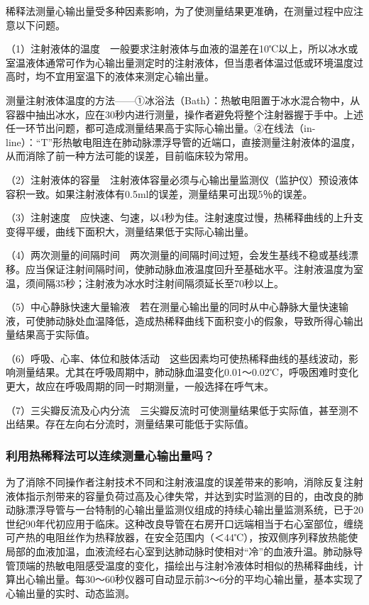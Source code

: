 稀释法测量心输出量受多种因素影响，为了使测量结果更准确，在测量过程中应注意以下问题。

（1）注射液体的温度　一般要求注射液体与血液的温差在10℃以上，所以冰水或室温液体通常可作为心输出量测定时的注射液体，但当患者体温过低或环境温度过高时，均不宜用室温下的液体来测定心输出量。

测量注射液体温度的方法------①冰浴法（Bath）：热敏电阻置于冰水混合物中，从容器中抽出冰水，应在30秒内进行测量，操作者避免将整个注射器握于手中。上述任一环节出问题，都可造成测量结果高于实际心输出量。②在线法（in-line）：“T”形热敏电阻连在肺动脉漂浮导管的近端口，直接测量注射液体的温度，从而消除了前一种方法可能的误差，目前临床较为常用。

（2）注射液体的容量　注射液体容量必须与心输出量监测仪（监护仪）预设液体容积一致。如果注射液体有0.5ml的误差，测量结果可出现5％的误差。

（3）注射速度　应快速、匀速，以4秒为佳。注射速度过慢，热稀释曲线的上升支变得平缓，曲线下面积大，测量结果低于实际心输出量。

（4）两次测量的间隔时间　两次测量的间隔时间过短，会发生基线不稳或基线漂移。应当保证注射间隔时间，使肺动脉血液温度回升至基础水平。注射液温度为室温，须间隔35秒；注射液为冰水时注射间隔须延长至70秒以上。

（5）中心静脉快速大量输液　若在测量心输出量的同时从中心静脉大量快速输液，可使肺动脉处血温降低，造成热稀释曲线下面积变小的假象，导致所得心输出量结果高于实际值。

（6）呼吸、心率、体位和肢体活动　这些因素均可使热稀释曲线的基线波动，影响测量结果。尤其在呼吸周期中，肺动脉血温变化0.01～0.02℃，呼吸困难时变化更大，故应在呼吸周期的同一时期测量，一般选择在呼气末。

（7）三尖瓣反流及心内分流　三尖瓣反流时可使测量结果低于实际值，甚至测不出结果。存在左向右分流时，测量结果可能低于实际值。

\subsubsection{利用热稀释法可以连续测量心输出量吗？}

为了消除不同操作者注射技术不同和注射液温度的误差带来的影响，消除反复注射液体指示剂带来的容量负荷过高及心律失常，并达到实时监测的目的，由改良的肺动脉漂浮导管与一台特制的心输出量监测仪组成的持续心输出量监测系统，已于20世纪90年代初应用于临床。这种改良导管在右房开口远端相当于右心室部位，缠绕可产热的电阻丝作为热释放器，在安全范围内（＜44℃），按双侧序列释放热能使局部的血液加温，血液流经右心室到达肺动脉时使相对“冷”的血液升温。肺动脉导管顶端的热敏电阻感受温度的变化，描绘出与注射冷液体时相似的热稀释曲线，计算出心输出量。每30～60秒仪器可自动显示前3～6分的平均心输出量，基本实现了心输出量的实时、动态监测。

